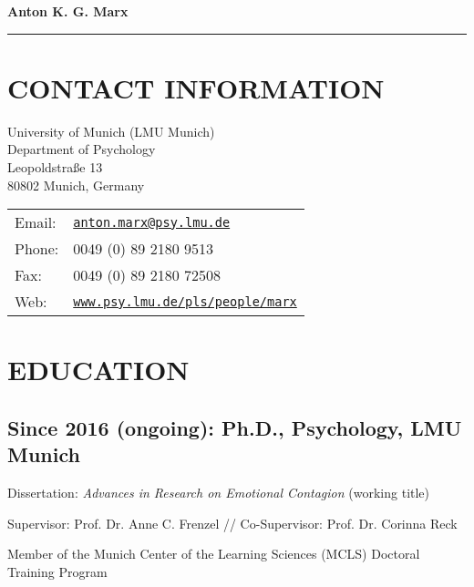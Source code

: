 \documentclass[letterpaper]{article}
\def\name{Anton K. G. Marx} %
\renewenvironment{itemize}{ %
  \begin{list}{}{ %
    \setlength{\leftmargin}{2.5em} %
  }
}{
  \end{list}
}
\begin{document}
\begin{center} %

{\Huge \bf \name}

\end{center}

\noindent\rule{\textwidth}{0.5pt} %

\section*{CONTACT INFORMATION}

\vspace{0in}



\begin{minipage}{0.45\linewidth}
  University of Munich (LMU Munich) \\
  Department of Psychology \\
  Leopoldstraße 13 \\
  80802 Munich, Germany
\end{minipage}
\begin{minipage}{1.45\linewidth}
  \begin{tabular}{ll}
    Email: & \href{mailto:anton.marx@psy.lmu.de}{\tt anton.marx@psy.lmu.de} \\
    Phone: & 0049 (0) 89  2180 9513 \\
    Fax: &  0049 (0) 89  2180 72508 \\
    Web: & \href{https://www.psy.lmu.de/pls/people/marx/}{\tt www.psy.lmu.de/pls/people/marx} \\
  \end{tabular}
\end{minipage}



\section*{EDUCATION}

\subsection*{Since 2016 (ongoing): Ph.D., Psychology, LMU Munich}
\begin{itemize}
  \item Dissertation: {\it Advances in Research on Emotional Contagion} (working title)
    \item Supervisor: Prof. Dr. Anne C. Frenzel // Co-Supervisor: Prof. Dr. Corinna Reck
    \item Member of the Munich Center of the Learning Sciences (MCLS) Doctoral Training Program
  \end{itemize}
\end{document}
